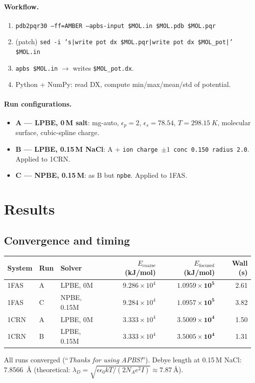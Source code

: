 \documentclass[11pt,letterpaper]{article}
\begin{document}
\paragraph{Workflow.}
\begin{enumerate}
\item \texttt{pdb2pqr30 --ff=AMBER --apbs-input \$MOL.in \$MOL.pdb \$MOL.pqr}
\item (patch) \texttt{sed -i 's|write pot dx \$MOL.pqr|write pot dx \$MOL\_pot|' \$MOL.in}
\item \texttt{apbs \$MOL.in} $\rightarrow$ writes \texttt{\$MOL\_pot.dx}.
\item Python + NumPy: read DX, compute min/max/mean/std of potential.
\end{enumerate}

\paragraph{Run configurations.}
\begin{itemize}
\item \textbf{A --- LPBE, 0\,M salt}: mg-auto, $\epsilon_p{=}2$, $\epsilon_s{=}78.54$, $T{=}\SI{298.15}{K}$, molecular surface, cubic-spline charge.
\item \textbf{B --- LPBE, 0.15\,M NaCl}: A + \texttt{ion charge $\pm 1$ conc 0.150 radius 2.0}. Applied to 1CRN.
\item \textbf{C --- NPBE, 0.15\,M}: as B but \texttt{npbe}. Applied to 1FAS.
\end{itemize}

\section{Results}

\subsection{Convergence and timing}
\begin{center}
\begin{tabular}{lllrrr}
\toprule
System & Run & Solver & $E_{\text{coarse}}$ (kJ/mol) & $E_{\text{focused}}$ (kJ/mol) & Wall (s) \\
\midrule
1FAS & A & LPBE, 0M     & $9.286\times10^4$ & $\mathbf{1.0959\times10^5}$ & 2.61 \\
1FAS & C & NPBE, 0.15M  & $9.284\times10^4$ & $\mathbf{1.0957\times10^5}$ & 3.82 \\
1CRN & A & LPBE, 0M     & $3.333\times10^4$ & $\mathbf{3.5009\times10^4}$ & 1.50 \\
1CRN & B & LPBE, 0.15M  & $3.333\times10^4$ & $\mathbf{3.5005\times10^4}$ & 1.31 \\
\bottomrule
\end{tabular}
\end{center}
All runs converged (``\emph{Thanks for using APBS!}''). Debye length at 0.15\,M NaCl: \SI{7.8566}{\angstrom} (theoretical: $\lambda_D = \sqrt{\epsilon \epsilon_0 k T / (2 N_A e^2 I)} \approx \SI{7.87}{\angstrom}$).
\end{document}
